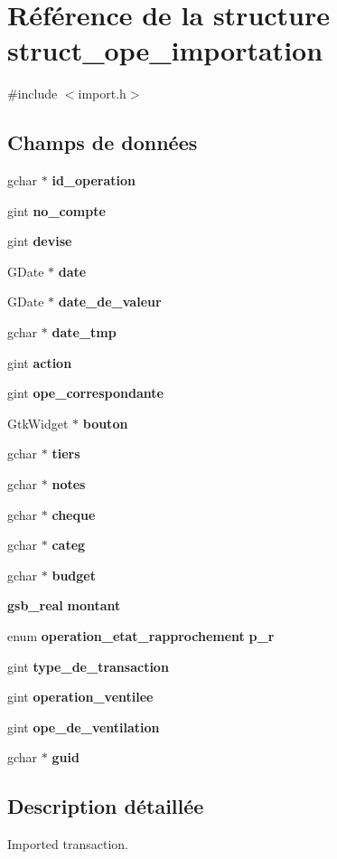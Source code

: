 \section{Référence de la structure struct\_\-ope\_\-importation}
\label{structstruct__ope__importation}


{\ttfamily \#include $<$import.h$>$}

\subsection*{Champs de données}
\begin{DoxyCompactItemize}
\item 
gchar $\ast$ {\bf id\_\-operation}
\item 
gint {\bf no\_\-compte}
\item 
gint {\bf devise}
\item 
GDate $\ast$ {\bf date}
\item 
GDate $\ast$ {\bf date\_\-de\_\-valeur}
\item 
gchar $\ast$ {\bf date\_\-tmp}
\item 
gint {\bf action}
\item 
gint {\bf ope\_\-correspondante}
\item 
GtkWidget $\ast$ {\bf bouton}
\item 
gchar $\ast$ {\bf tiers}
\item 
gchar $\ast$ {\bf notes}
\item 
gchar $\ast$ {\bf cheque}
\item 
gchar $\ast$ {\bf categ}
\item 
gchar $\ast$ {\bf budget}
\item 
{\bf gsb\_\-real} {\bf montant}
\item 
enum {\bf operation\_\-etat\_\-rapprochement} {\bf p\_\-r}
\item 
gint {\bf type\_\-de\_\-transaction}
\item 
gint {\bf operation\_\-ventilee}
\item 
gint {\bf ope\_\-de\_\-ventilation}
\item 
gchar $\ast$ {\bf guid}
\end{DoxyCompactItemize}


\subsection{Description détaillée}
Imported transaction. 

